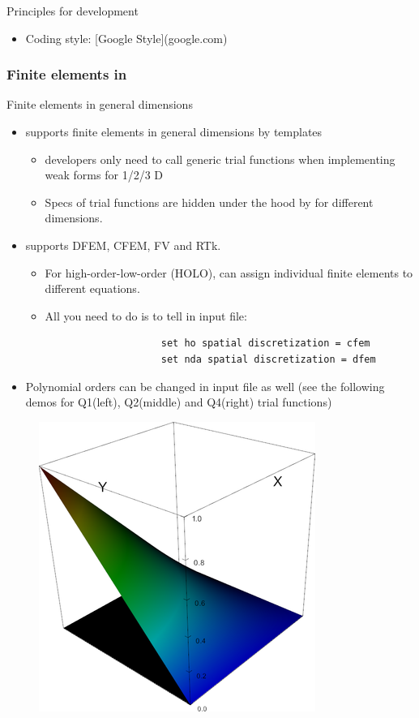 \begin{frame}{Principles for development}
	\begin{block}{}
		\begin{itemize}
			\item Coding style: [Google Style](google.com)
		\end{itemize}
	\end{block}
\end{frame}

\begin{frame}[fragile]
	\frametitle{Finite elements in }
	\begin{block}{Finite elements in general dimensions}
		\begin{itemize}
			\item {} supports finite elements in general dimensions by templates
			\begin{itemize}
				\item {} developers only need to call generic trial functions when implementing weak forms for 1/2/3 D
				\item Specs of trial functions are hidden under the hood by  for different dimensions.
			\end{itemize}
			\item {} supports DFEM, CFEM, FV and RTk.
			\begin{itemize}
				\item For high-order-low-order (HOLO),  can assign individual finite elements to different equations.
				\item All you need to do is to tell  in input file:
				{
					\color{red}
					\begin{verbatim}
					set ho spatial discretization = cfem
					set nda spatial discretization = dfem
					\end{verbatim}
				}
			\end{itemize}
			\item Polynomial orders can be changed in input file as well (see the following demos for Q1(left), Q2(middle) and Q4(right) trial functions)
		\end{itemize}
	\end{block}
	\begin{figure}
		\includegraphics*[scale=0.25]{graphic/fe/q1_fe}

\end{figure}
\end{frame}

